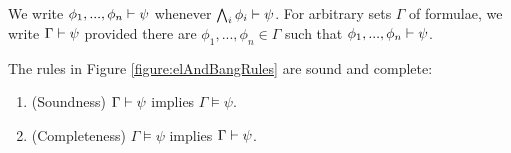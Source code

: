 \begin{definition}
We write $\phi_1, ...,
\phi_n \vdash \psi$ whenever $\bigwedge_{i}\phi_i \vdash \psi$.  For
arbitrary sets $\Gamma$ of formulae, we write $\Gamma \vdash \psi$
provided there are $\phi_1, ..., \phi_n \in \Gamma$ such that $\phi_1,
..., \phi_n \vdash \psi$.
\end{definition}

\begin{corollary}
The rules in Figure \ref{figure:elAndBangRules} are sound and complete:
\begin{enumerate}

\item(Soundness) $\Gamma \vdash \psi$ implies $\Gamma \models \psi$.

\item (Completeness) $\Gamma \models \psi$ implies $\Gamma \vdash \psi$. 

\end{enumerate}
\end{corollary}

